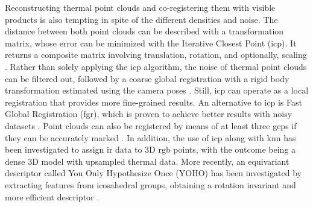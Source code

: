 Reconstructing thermal point clouds and co-registering them with visible products is also tempting in spite of the different densities and noise. The distance between both point clouds can be described with a transformation matrix, whose error can be minimized with the Iterative Closest Point (\acrshort{icp}). It returns a composite matrix involving translation, rotation, and optionally, scaling \cite{hoegner_mobile_2018, webster_three-dimensional_2018, clarkson_thermal_2017}. Rather than solely applying the \acrshort{icp} algorithm, the noise of thermal point clouds can be filtered out, followed by a coarse global registration with a rigid body transformation estimated using the camera poses \cite{truong_registration_2017}. Still, \acrshort{icp} can operate as a local registration that provides more fine-grained results. An alternative to \acrshort{icp} is Fast Global Registration (\acrshort{fgr}), which is proven to achieve better results with noisy datasets \cite{lin_fusion_2019}. Point clouds can also be registered by means of at least three \acrshort{gcp}s if they can be accurately marked \cite{dahaghin_3d_2019}. In addition, the use of \acrshort{icp} along with \acrshort{knn} has been investigated to assign \acrshort{ir} data to 3D \acrshort{rgb} points, with the outcome being a dense 3D model with upsampled thermal data. More recently, an equivariant descriptor called You Only Hypothesize Once (YOHO) has been investigated by extracting features from icosahedral groups, obtaining a rotation invariant and more efficient descriptor \cite{wang_you_2022}.

